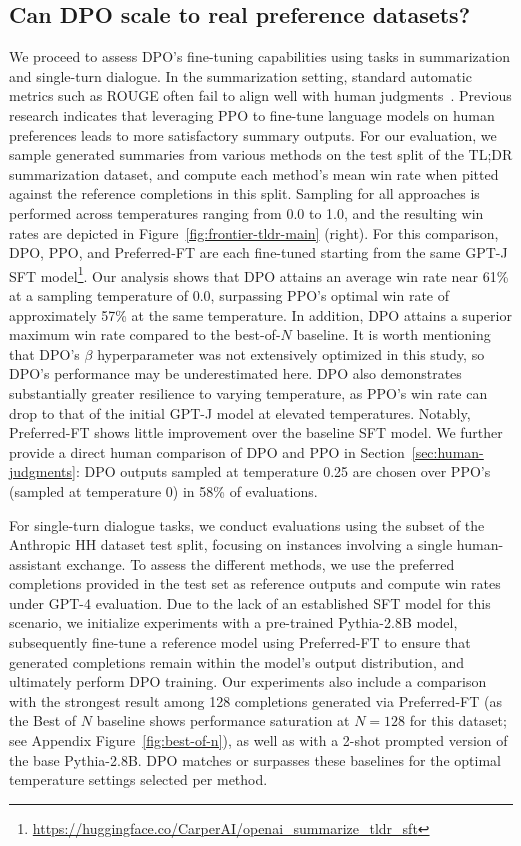 \subsection{Can DPO scale to real preference datasets?}
\label{sec:dpo-real-datasets}
We proceed to assess DPO’s fine-tuning capabilities using tasks in summarization and single-turn dialogue. In the summarization setting, standard automatic metrics such as ROUGE often fail to align well with human judgments~\citep{stiennon2022learning}. Previous research indicates that leveraging PPO to fine-tune language models on human preferences leads to more satisfactory summary outputs. For our evaluation, we sample generated summaries from various methods on the test split of the TL;DR summarization dataset, and compute each method’s mean win rate when pitted against the reference completions in this split. Sampling for all approaches is performed across temperatures ranging from 0.0 to 1.0, and the resulting win rates are depicted in Figure~\ref{fig:frontier-tldr-main} (right). For this comparison, DPO, PPO, and Preferred-FT are each fine-tuned starting from the same GPT-J SFT model\footnote{\url{https://huggingface.co/CarperAI/openai_summarize_tldr_sft}}. Our analysis shows that DPO attains an average win rate near 61\% at a sampling temperature of 0.0, surpassing PPO’s optimal win rate of approximately 57\% at the same temperature. In addition, DPO attains a superior maximum win rate compared to the best-of-$N$ baseline. It is worth mentioning that DPO’s $\beta$ hyperparameter was not extensively optimized in this study, so DPO’s performance may be underestimated here. DPO also demonstrates substantially greater resilience to varying temperature, as PPO’s win rate can drop to that of the initial GPT-J model at elevated temperatures. Notably, Preferred-FT shows little improvement over the baseline SFT model. We further provide a direct human comparison of DPO and PPO in Section~\ref{sec:human-judgments}: DPO outputs sampled at temperature 0.25 are chosen over PPO’s (sampled at temperature 0) in 58\% of evaluations.

For single-turn dialogue tasks, we conduct evaluations using the subset of the Anthropic HH dataset \citep{bai2022training} test split, focusing on instances involving a single human-assistant exchange. To assess the different methods, we use the preferred completions provided in the test set as reference outputs and compute win rates under GPT-4 evaluation. Due to the lack of an established SFT model for this scenario, we initialize experiments with a pre-trained Pythia-2.8B model, subsequently fine-tune a reference model using Preferred-FT to ensure that generated completions remain within the model’s output distribution, and ultimately perform DPO training. Our experiments also include a comparison with the strongest result among 128 completions generated via Preferred-FT (as the Best of $N$ baseline shows performance saturation at $N=128$ for this dataset; see Appendix Figure~\ref{fig:best-of-n}), as well as with a 2-shot prompted version of the base Pythia-2.8B. DPO matches or surpasses these baselines for the optimal temperature settings selected per method. 

